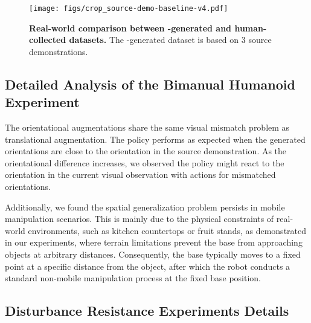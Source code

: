 \begin{appendix}
\begin{figure}
    \centering
    \texttt{[image: figs/crop\_source-demo-baseline-v4.pdf]}
    \caption{\textbf{Real-world comparison between \method-generated and human-collected datasets.} The \method-generated dataset is based on $3$ source demonstrations.}
    \label{fig:source-baseline}
\end{figure}


\subsection{Detailed Analysis of the Bimanual Humanoid Experiment}
\label{sec:appendix-humanoid}

The orientational augmentations share the same visual mismatch problem as translational augmentation. The policy performs as expected when the generated orientations are close to the orientation in the source demonstration. As the orientational difference increases, we observed the policy might react to the orientation in the current visual observation with actions for mismatched orientations.



Additionally, we found the spatial generalization problem persists in mobile manipulation scenarios. This is mainly due to the physical constraints of real-world environments, such as kitchen countertops or fruit stands, as demonstrated in our experiments, where terrain limitations prevent the base from approaching objects at arbitrary distances. Consequently, the base typically moves to a fixed point at a specific distance from the object, after which the robot conducts a standard non-mobile manipulation process at the fixed base position.



\subsection{Disturbance Resistance Experiments Details}
\label{sec:appendix-disturb}

\end{appendix}

